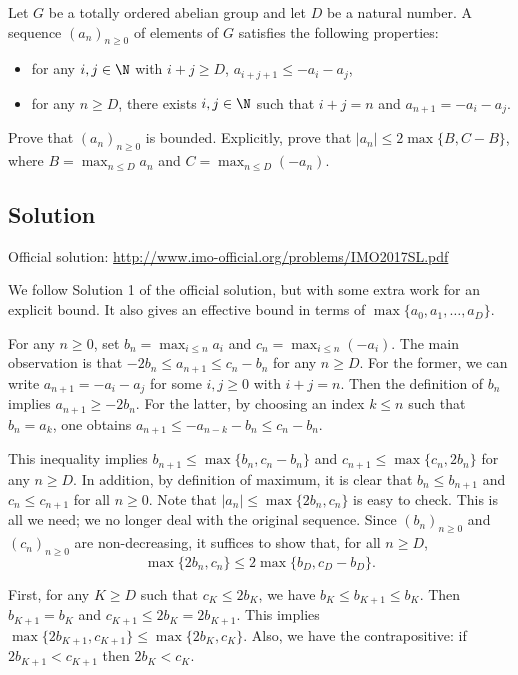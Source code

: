 Let $G$ be a totally ordered abelian group and let $D$ be a natural number.
A sequence $(a_n)_{n \geq 0}$ of elements of $G$ satisfies the following properties:
\begin{itemize}
    \item   for any $i, j \in \N$ with $i + j \geq D$, $a_{i + j + 1} \leq -a_i - a_j$,
    \item   for any $n \geq D$, there exists $i, j \in \N$ such that $i + j = n$ and $a_{n + 1} = -a_i - a_j$.
\end{itemize}
Prove that $(a_n)_{n \geq 0}$ is bounded.
Explicitly, prove that $|a_n| \leq 2 \max\{B, C - B\}$, where $B = \max_{n \leq D} a_n$ and $C = \max_{n \leq D} (-a_n)$.



\subsection*{Solution}

Official solution: \url{http://www.imo-official.org/problems/IMO2017SL.pdf}

We follow Solution 1 of the official solution, but with some extra work for an explicit bound.
It also gives an effective bound in terms of $\max\{a_0, a_1, \ldots, a_D\}$.

For any $n \geq 0$, set $b_n = \max_{i \leq n} a_i$ and $c_n = \max_{i \leq n} (-a_i)$.
The main observation is that $-2 b_n \leq a_{n + 1} \leq c_n - b_n$ for any $n \geq D$.
For the former, we can write $a_{n + 1} = -a_i - a_j$ for some $i, j \geq 0$ with $i + j = n$.
Then the definition of $b_n$ implies $a_{n + 1} \geq -2 b_n$.
For the latter, by choosing an index $k \leq n$ such that $b_n = a_k$, one obtains $a_{n + 1} \leq -a_{n - k} - b_n \leq c_n - b_n$.

This inequality implies $b_{n + 1} \leq \max\{b_n, c_n - b_n\}$ and $c_{n + 1} \leq \max\{c_n, 2 b_n\}$ for any $n \geq D$.
In addition, by definition of maximum, it is clear that $b_n \leq b_{n + 1}$ and $c_n \leq c_{n + 1}$ for all $n \geq 0$.
Note that $|a_n| \leq \max\{2 b_n, c_n\}$ is easy to check.
This is all we need; we no longer deal with the original sequence.
Since $(b_n)_{n \geq 0}$ and $(c_n)_{n \geq 0}$ are non-decreasing, it suffices to show that, for all $n \geq D$,
\[ \max\{2 b_n, c_n\} \leq 2 \max\{b_D, c_D - b_D\}. \tag{1}\label{2017a4-eq1} \]

First, for any $K \geq D$ such that $c_K \leq 2 b_K$, we have $b_K \leq b_{K + 1} \leq b_K$.
Then $b_{K + 1} = b_K$ and $c_{K + 1} \leq 2 b_K = 2 b_{K + 1}$.
This implies $\max\{2 b_{K + 1}, c_{K + 1}\} \leq \max\{2 b_K, c_K\}$.
Also, we have the contrapositive: if $2 b_{K + 1} < c_{K + 1}$ then $2 b_K < c_K$.

